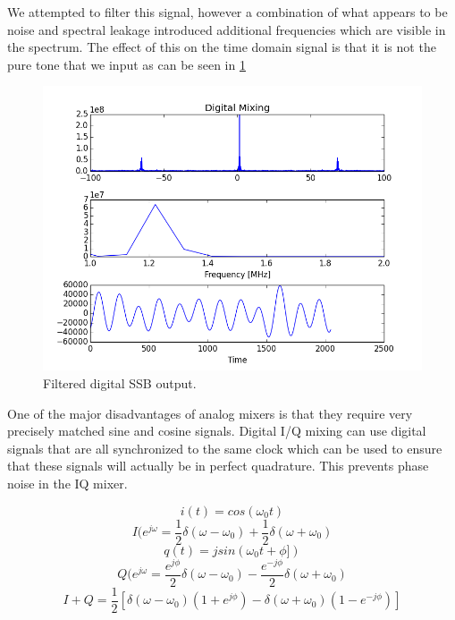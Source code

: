 \documentclass{article}
\begin{document}
  We attempted to filter this signal, however a combination of what appears to be noise and spectral leakage introduced additional frequencies which are visible in the spectrum.  The effect of this on the time domain signal is that it is not the pure tone that we input as can be seen in \ref{fig:digital_ssb_t}
\begin{figure}[h!]
\centering
\includegraphics[scale=0.7]{digital_filtered.png}
\caption{Filtered digital SSB output.}
\label{fig:digital_ssb_t}
\end{figure}
  One of the major disadvantages of analog mixers is that they require very precisely matched sine and cosine signals. Digital I/Q mixing can use digital signals that are all synchronized to the same clock which can be used to ensure that these signals will actually be in perfect quadrature. This prevents phase noise in the IQ mixer. 
  
 $$ i(t) = cos(\omega_0 t) $$
 $$ I(e^{j\omega} = \frac{1}{2} \delta(\omega-\omega_0) + \frac{1}{2} \delta(\omega+\omega_0)$$
 $$ q(t) = jsin(\omega_0 t + \phi]{}) $$
 $$ Q(e^{j\omega} = \frac{e^{j\phi}}{2} \delta(\omega-\omega_0) - \frac{e^{-j\phi}}{2} \delta(\omega+\omega_0)$$
 $$ I + Q = \frac{1}{2} [\delta(\omega-\omega_0)(1+e^{j\phi}) - \delta(\omega+\omega_0)(1-e^{-j\phi})]$$
 
\end{document}
